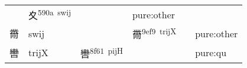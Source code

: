 \documentclass[14pt,a4paper]{scrartcl}
\begin{document}
\begin{longtable}[c]{@{}llllll@{}}
\begin{minipage}[t]{0.14\columnwidth}
\strut\end{minipage} &
\begin{minipage}[t]{0.14\columnwidth}\raggedright\strut
夊\textsuperscript{590a~swij}
\strut\end{minipage} &
\begin{minipage}[t]{0.14\columnwidth}\raggedright\strut
\strut\end{minipage} &
\begin{minipage}[t]{0.14\columnwidth}\raggedright\strut
pure:other
\strut\end{minipage}\tabularnewline
\begin{minipage}[t]{0.14\columnwidth}\raggedright\strut
黹
\strut\end{minipage} &
\begin{minipage}[t]{0.14\columnwidth}\raggedright\strut
swij
\strut\end{minipage} &
\begin{minipage}[t]{0.14\columnwidth}\raggedright\strut
\strut\end{minipage} &
\begin{minipage}[t]{0.14\columnwidth}\raggedright\strut
黹\textsuperscript{9ef9~trijX}
\strut\end{minipage} &
\begin{minipage}[t]{0.14\columnwidth}\raggedright\strut
\strut\end{minipage} &
\begin{minipage}[t]{0.14\columnwidth}\raggedright\strut
pure:other
\strut\end{minipage}\tabularnewline
\begin{minipage}[t]{0.14\columnwidth}\raggedright\strut
轡
\strut\end{minipage} &
\begin{minipage}[t]{0.14\columnwidth}\raggedright\strut
trijX
\strut\end{minipage} &
\begin{minipage}[t]{0.14\columnwidth}\raggedright\strut
轡\textsuperscript{8f61~pijH}
\strut\end{minipage} &
\begin{minipage}[t]{0.14\columnwidth}\raggedright\strut
\strut\end{minipage} &
\begin{minipage}[t]{0.14\columnwidth}\raggedright\strut
\strut\end{minipage} &
\begin{minipage}[t]{0.14\columnwidth}\raggedright\strut
pure:qu
\strut\end{minipage}\tabularnewline

\end{longtable}
\end{document}

